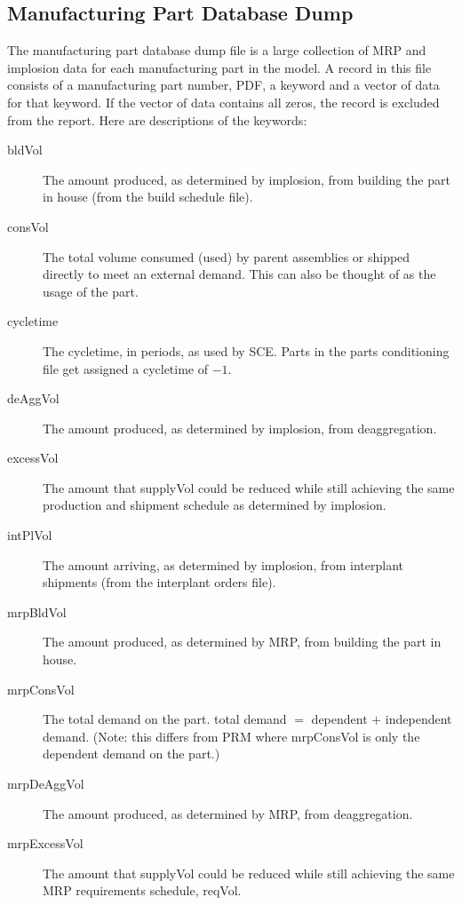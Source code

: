 \subsection{Manufacturing Part Database Dump}
The manufacturing part database dump file is a large collection of MRP
and implosion data for each manufacturing part in the model.  A record
in this file consists of a manufacturing part number, PDF, a keyword
and a vector of data for that keyword.  If the vector of data contains
all zeros, the record is excluded from the report.  Here are
descriptions of the keywords:
\begin{description}

\item[bldVol] 
The amount produced, as determined by implosion, from building the
part in house (from the build schedule file).

\item[consVol] 
The total volume consumed (used) by parent assemblies or
shipped directly to meet an external demand.  This can also be 
thought of as the usage of the part.

\item[cycletime]
The cycletime, in periods, as used by SCE.  Parts in the parts
conditioning file get assigned a cycletime of $-1$.

\item[deAggVol] 
The amount produced, as determined by implosion, from deaggregation.

\item[excessVol] 
The amount that supplyVol could be reduced while still 
achieving the same production and shipment schedule as determined by
implosion.

\item[intPlVol]
The amount arriving, as determined by implosion, from interplant
shipments (from the interplant orders file).

\item[mrpBldVol] 
The amount produced, as determined by MRP, from building the part in
house.

\item[mrpConsVol]  
The total demand on the part.  
total demand $=$ dependent $+$ independent demand.  (Note: this
differs from PRM where mrpConsVol is only the dependent demand on the
part.)

\item[mrpDeAggVol] 
The amount produced, as determined by MRP, from deaggregation.

\item[mrpExcessVol] 
The amount that supplyVol could be reduced while still 
achieving the same MRP requirements schedule, reqVol. 


\end{description}
